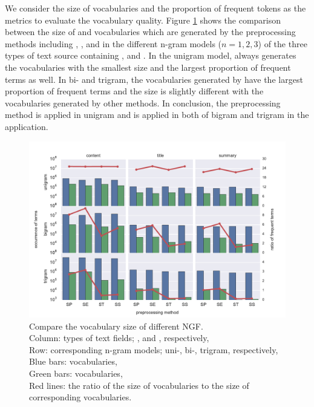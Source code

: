 We consider the size of \ifull{} vocabularies and the proportion of frequent tokens as the metrics to evaluate the vocabulary quality. Figure \ref{fig:vocab_size} shows the comparison between the size of \ifull{} and \icommon{} vocabularies which are generated by the preprocessing methods including \iSP{}, \iSE{}, \iST{} and \iSS{} in the different n-gram models ($n=1, 2, 3$) of the three types of text source containing \icontent{}, \ititle{} and \isummary{}. In the unigram model, \iSS{} always generates the vocabularies with the smallest size and the largest proportion of frequent terms as well. In bi- and trigram, the vocabularies generated by \iSE{} have the largest proportion of frequent terms and the size is slightly different with the vocabularies generated by other methods. In conclusion, the preprocessing method \iSS{} is applied in unigram and \iSE{} is applied in both of bigram and trigram in the application. 

\begin{figure}[!htb]
    \centering
    \includegraphics[width=\textwidth]{fig/vocab_size}
    \caption{Compare the vocabulary size of different NGF. \\
    Column: types of text fields; \icontent{}, \ititle{} and \isummary{}, respectively, \\
    Row: corresponding n-gram models; uni-, bi-, trigram, respectively, \\
    Blue bars: \ifull{} vocabularies, \\
    Green bars: \icommon{} vocabularies, \\
    Red lines: the ratio of the size of \icommon{} vocabularies to the size of corresponding \ifull{} vocabularies.}
    \label{fig:vocab_size}
\end{figure}


